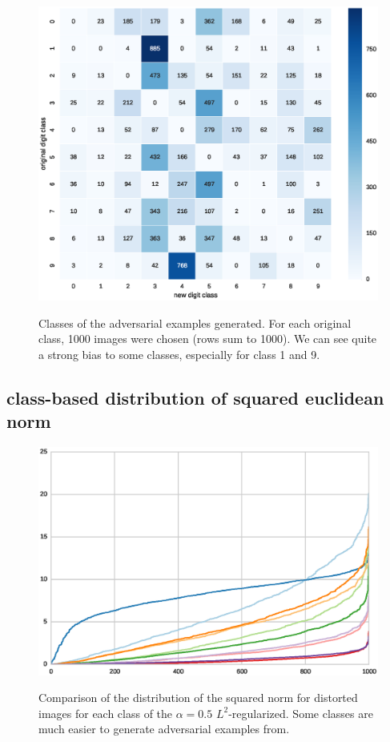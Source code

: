 \documentclass{article} %
\begin{document}
\begin{figure}[h!]
\begin{center}
\includegraphics[scale=0.6]{figs/sup_3}
\label{exp:sup_2_bigger}
\caption{\small Classes of the adversarial examples generated.
For each original class, 1000 images were chosen (rows sum to 1000). We can see quite a strong bias to some classes, especially
for class 1 and 9.}
\end{center}
\end{figure}

\clearpage

\subsection{class-based distribution of squared euclidean norm}

\begin{figure}[h!]
\begin{center}
\includegraphics[scale=0.6]{figs/sup_4}
\label{exp:sup_4}
\caption{\small Comparison of the distribution of the squared norm for distorted images for each class of the
$\alpha=0.5$ $L^2$-regularized. Some classes are much
easier to generate adversarial examples from.}
\end{center}
\end{figure}
\end{document}
